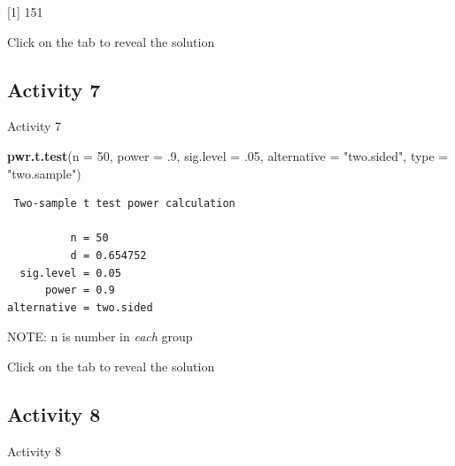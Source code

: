 \documentclass[]{book}
\newenvironment{Shaded}{\begin{snugshade}}{\end{snugshade}}
\newcommand{\DataTypeTok}[1]{\textcolor[rgb]{0.13,0.29,0.53}{#1}}
\newcommand{\DecValTok}[1]{\textcolor[rgb]{0.00,0.00,0.81}{#1}}
\newcommand{\FloatTok}[1]{\textcolor[rgb]{0.00,0.00,0.81}{#1}}
\newcommand{\KeywordTok}[1]{\textcolor[rgb]{0.13,0.29,0.53}{\textbf{#1}}}
\newcommand{\NormalTok}[1]{#1}
\newcommand{\OperatorTok}[1]{\textcolor[rgb]{0.81,0.36,0.00}{\textbf{#1}}}
\newcommand{\StringTok}[1]{\textcolor[rgb]{0.31,0.60,0.02}{#1}}
\begin{document}
{[}1{]} 151

Click on the tab to reveal the solution

\hypertarget{activity-7-3}{%
\subsection{Activity 7}\label{activity-7-3}}

Activity 7

\begin{Shaded}
\begin{Highlighting}[]
\KeywordTok{pwr.t.test}\NormalTok{(}\DataTypeTok{n =} \DecValTok{50}\NormalTok{,}
           \DataTypeTok{power =} \FloatTok{.9}\NormalTok{, }
           \DataTypeTok{sig.level =} \FloatTok{.05}\NormalTok{, }
           \DataTypeTok{alternative =} \StringTok{"two.sided"}\NormalTok{, }
           \DataTypeTok{type =} \StringTok{"two.sample"}\NormalTok{)}
\end{Highlighting}
\end{Shaded}

\begin{verbatim}
 Two-sample t test power calculation 

          n = 50
          d = 0.654752
  sig.level = 0.05
      power = 0.9
alternative = two.sided
\end{verbatim}

NOTE: n is number in \emph{each} group

Click on the tab to reveal the solution

\hypertarget{activity-8-3}{%
\subsection{Activity 8}\label{activity-8-3}}

Activity 8

\begin{Shaded}
\end{Shaded}
\end{document}
